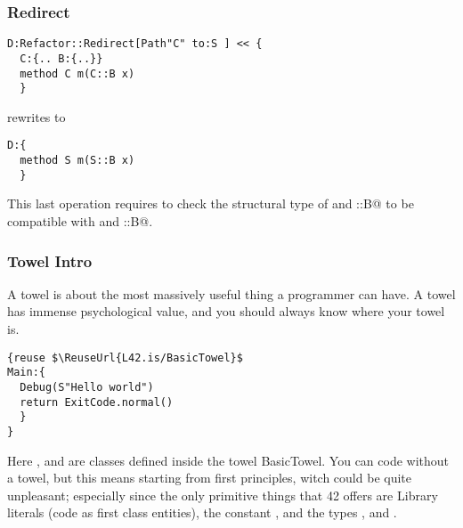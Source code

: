 \begin{frame}[fragile]
\frametitle{Redirect}
\begin{NiceCode}{59ex}{0.8}
\begin{lstlisting}
D:Refactor::Redirect[Path"C" to:S ] << {
  C:{.. B:{..}}
  method C m(C::B x)
  }
\end{lstlisting}
\end{NiceCode}
rewrites to 
\begin{NiceCode}{59ex}{0.8}
\begin{lstlisting}
D:{
  method S m(S::B x)
  }
\end{lstlisting}
\end{NiceCode}
This last operation requires to check the structural type of
\Q@S@ and \Q@S::B@ to be compatible with \Q@C@ and \Q@C::B@.
\end{frame}



\begin{frame}[fragile]
\frametitle{Towel Intro}
A towel is about the most massively useful thing a programmer can have.
A towel has immense psychological value, and you should always know where your towel is.
\begin{NiceCode}{59ex}{1}
\begin{lstlisting}
{reuse $\ReuseUrl{L42.is/BasicTowel}$
Main:{
  Debug(S"Hello world")
  return ExitCode.normal()
  }
}
\end{lstlisting}
\end{NiceCode}
Here \Q@Debug@, \Q@S@ and \Q@ExitCode@ are classes defined inside the towel
BasicTowel.
You can code without a towel, but this means starting from first principles,
witch could be quite unpleasant; especially since the only
primitive things that 42 offers are Library literals
(code as first class entities), the constant \Q@void@,
and the types \Q@Library@, \Q@Void@ and \Q@Any@.
\end{frame}

